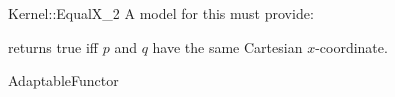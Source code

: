 \begin{ccRefFunctionObjectConcept}{Kernel::EqualX_2}
A model for this must provide:


{returns true iff $p$ and $q$ have the same Cartesian $x$-coordinate.}

\ccRefines
AdaptableFunctor

\ccSeeAlso
{}\\

\end{ccRefFunctionObjectConcept}
